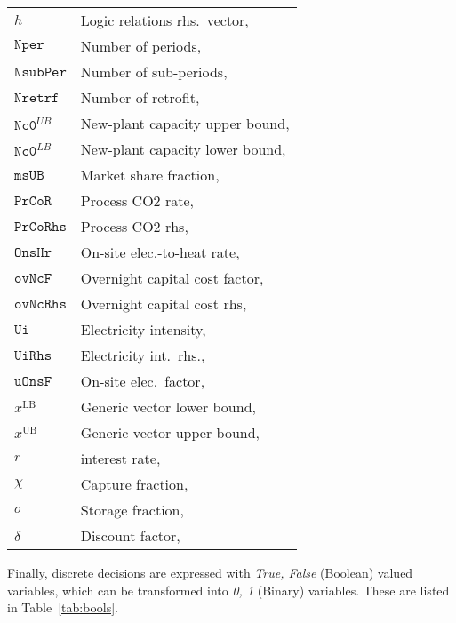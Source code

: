 \documentclass{amsbook}
\begin{document}
\begin{longtable}[c]{@{}ll@{}}
    $h$ & Logic relations rhs.\ vector,\\
    $\mathtt{Nper}$	& Number of periods, \\
    $\mathtt{NsubPer}$	& Number of sub-periods, \\
    $\mathtt{Nretrf}$	& Number of retrofit, \\
    $\mathtt{Nc0}^{UB}$	& New-plant capacity upper bound, \\
    $\mathtt{Nc0}^{LB}$	& New-plant capacity lower bound, \\
    $\mathtt{msUB}$ & Market share fraction, \\
    $\mathtt{PrCoR}$	& Process CO2 rate, \\
    $\mathtt{PrCoRhs}$	& Process CO2 rhs, \\
    $\mathtt{OnsHr}$	& On-site elec.-to-heat rate, \\
    $\mathtt{ovNcF}$	& Overnight capital cost factor, \\
    $\mathtt{ovNcRhs}$	& Overnight capital cost rhs, \\
    $\mathtt{Ui}$	& Electricity intensity, \\
    $\mathtt{UiRhs}$	& Electricity int.\ rhs., \\
    $\mathtt{uOnsF}$	& On-site elec.\ factor, \\
    $x^{\text{LB}}$ & Generic vector lower bound,\\
    $x^{\text{UB}}$ & Generic vector upper bound,\\
    $r$	& interest rate, \\
    $\chi$	& Capture fraction, \\
    $\sigma$	& Storage fraction, \\
    $\delta$ & Discount factor, \\
\end{longtable}
%
Finally, discrete decisions are expressed with \emph{True, False} (Boolean)
valued variables, which can be transformed into \emph{0, 1} (Binary) variables.
These are listed in Table~\ref{tab:bools}.
%
\end{document}
